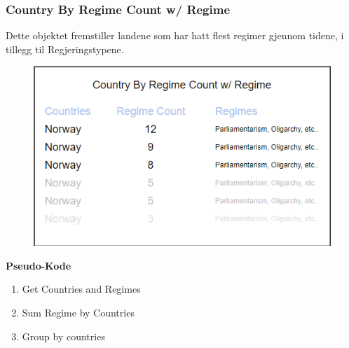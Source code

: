 \subsubsection{Country By Regime Count w/ Regime}
Dette objektet fremstiller landene som har hatt flest regimer gjennom tidene, i tillegg til 
Regjeringstypene.

\FigureCounter
\begin{figure}[H]
  \includegraphics[scale=1]{images/milepael4/countryByRegimeCountWithRegime.png}
\end{figure}

\textbf{Pseudo-Kode}
\begin{enumerate}
  \item Get Countries and Regimes
  \item Sum Regime by Countries
  \item Group by countries
\end{enumerate}